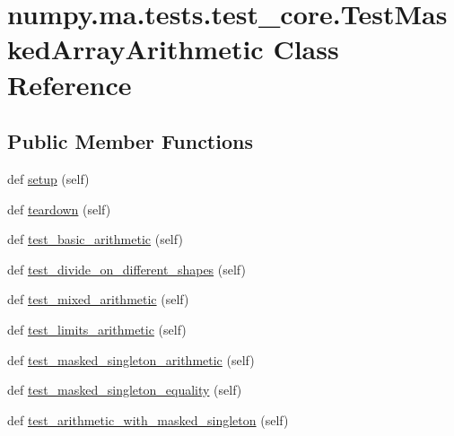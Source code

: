 \hypertarget{classnumpy_1_1ma_1_1tests_1_1test__core_1_1TestMaskedArrayArithmetic}{}\section{numpy.\+ma.\+tests.\+test\+\_\+core.\+Test\+Masked\+Array\+Arithmetic Class Reference}
\label{classnumpy_1_1ma_1_1tests_1_1test__core_1_1TestMaskedArrayArithmetic}
\subsection*{Public Member Functions}
\begin{DoxyCompactItemize}
\item 
def \hyperlink{classnumpy_1_1ma_1_1tests_1_1test__core_1_1TestMaskedArrayArithmetic_a2fc95f75ef0be66f87af7f1817c42b28}{setup} (self)
\item 
def \hyperlink{classnumpy_1_1ma_1_1tests_1_1test__core_1_1TestMaskedArrayArithmetic_ac563e5b0f44715de99a95ce8a927ae5b}{teardown} (self)
\item 
def \hyperlink{classnumpy_1_1ma_1_1tests_1_1test__core_1_1TestMaskedArrayArithmetic_a56bdc2725cc192cc8fc041ee719916c9}{test\+\_\+basic\+\_\+arithmetic} (self)
\item 
def \hyperlink{classnumpy_1_1ma_1_1tests_1_1test__core_1_1TestMaskedArrayArithmetic_a1cdfbcf2dc3a65e5f9ece94303b7ac1f}{test\+\_\+divide\+\_\+on\+\_\+different\+\_\+shapes} (self)
\item 
def \hyperlink{classnumpy_1_1ma_1_1tests_1_1test__core_1_1TestMaskedArrayArithmetic_a20bf044aee807d3ee3224226c79af30e}{test\+\_\+mixed\+\_\+arithmetic} (self)
\item 
def \hyperlink{classnumpy_1_1ma_1_1tests_1_1test__core_1_1TestMaskedArrayArithmetic_af81f0ccd976fbd410cdc80f86550406a}{test\+\_\+limits\+\_\+arithmetic} (self)
\item 
def \hyperlink{classnumpy_1_1ma_1_1tests_1_1test__core_1_1TestMaskedArrayArithmetic_a6ce452911959ea869f8fb954b55e8e47}{test\+\_\+masked\+\_\+singleton\+\_\+arithmetic} (self)
\item 
def \hyperlink{classnumpy_1_1ma_1_1tests_1_1test__core_1_1TestMaskedArrayArithmetic_a2e26a04445769ed55db560a63b3e20f0}{test\+\_\+masked\+\_\+singleton\+\_\+equality} (self)
\item 
def \hyperlink{classnumpy_1_1ma_1_1tests_1_1test__core_1_1TestMaskedArrayArithmetic_a4efb2808b810d232f89faa91930d5cb6}{test\+\_\+arithmetic\+\_\+with\+\_\+masked\+\_\+singleton} (self)

\end{DoxyCompactItemize}
